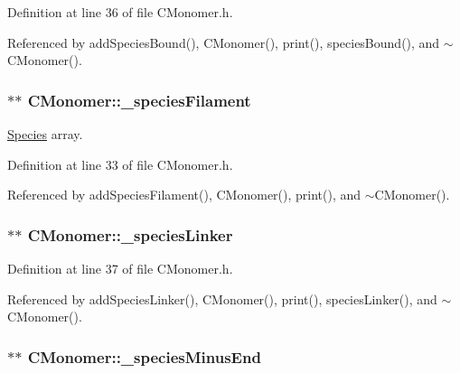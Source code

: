 Definition at line 36 of file C\+Monomer.\+h.



Referenced by add\+Species\+Bound(), C\+Monomer(), print(), species\+Bound(), and $\sim$\+C\+Monomer().

\hypertarget{classCMonomer_aa6d658b1fb0e90a549bfc0dedfc3b2a5}{
\subsubsection[{\+\_\+species\+Filament}]{$\ast$$\ast$ C\+Monomer\+::\+\_\+species\+Filament\hspace{0.3cm}{\ttfamily [private]}}}\label{classCMonomer_aa6d658b1fb0e90a549bfc0dedfc3b2a5}


\hyperlink{classSpecies}{Species} array. 



Definition at line 33 of file C\+Monomer.\+h.



Referenced by add\+Species\+Filament(), C\+Monomer(), print(), and $\sim$\+C\+Monomer().

\hypertarget{classCMonomer_aa549a348f1f8e77283c4aaa2e555aca1}{
\subsubsection[{\+\_\+species\+Linker}]{$\ast$$\ast$ C\+Monomer\+::\+\_\+species\+Linker\hspace{0.3cm}{\ttfamily [private]}}}\label{classCMonomer_aa549a348f1f8e77283c4aaa2e555aca1}


Definition at line 37 of file C\+Monomer.\+h.



Referenced by add\+Species\+Linker(), C\+Monomer(), print(), species\+Linker(), and $\sim$\+C\+Monomer().

\hypertarget{classCMonomer_a76ec86baa9b2f8e4711389481b191584}{
\subsubsection[{\+\_\+species\+Minus\+End}]{$\ast$$\ast$ C\+Monomer\+::\+\_\+species\+Minus\+End\hspace{0.3cm}{\ttfamily [private]}}}\label{classCMonomer_a76ec86baa9b2f8e4711389481b191584}


